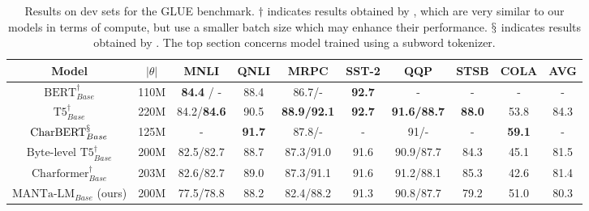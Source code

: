 \begin{table}[t]
\centering\small
\begin{adjustbox}{width=1\textwidth}
\begin{tabular}{cccccccccc}
\toprule
Model                                   & $|\theta|$ & MNLI      & QNLI & MRPC      & SST-2 & QQP       & STSB & COLA & AVG  \\ \midrule
$\text{BERT}_{Base}^\dagger$            & 110M       & \textbf{84.4} / -  & 88.4 & 86.7/-    & \textbf{92.7}  & -         & -    & -    & -    \\[3pt]
$\text{T5}_{Base}^\dagger$              & 220M       & 84.2/\textbf{84.6} & 90.5 & \textbf{88.9/92.1} & \textbf{92.7} & \textbf{91.6/88.7} & \textbf{88.0} & 53.8 & 84.3 \\ \midrule
$\text{CharBERT}_{Base}^\mathsection$   & 125M       & -         & \textbf{91.7} & 87.8/-    & -     & 91/-      & -    & \textbf{59.1} & -    \\[3pt]
$\text{Byte-level T5}_{Base}^\dagger$   & 200M       & 82.5/82.7 & 88.7 & 87.3/91.0 & 91.6  & 90.9/87.7 & 84.3 & 45.1 & 81.5 \\[3pt]
$\text{Charformer}_{Base}^\dagger$      & 203M       & 82.6/82.7 & 89.0 & 87.3/91.1 & 91.6  & 91.2/88.1 & 85.3 & 42.6 & 81.4 \\[3pt]
$\text{MANTa-LM}_{Base}$ (ours)     & 200M        & 77.5/78.8 & 88.2 & 82.4/88.2 & 91.3  & 90.8/87.7 & 79.2 & 51.0 & 80.3\\ [3pt] \bottomrule
\end{tabular}
\end{adjustbox}

\caption{Results on dev sets for the GLUE benchmark. $\dagger$ indicates results obtained by \citet{tay2021charformer}, which are very similar to our models in terms of compute, but use a smaller batch size which may enhance their performance. $\mathsection$ indicates results obtained by \citet{ma-etal-2020-charbert}. The top section concerns model trained using a subword tokenizer.}
\label{tab:glue}
\end{table}

